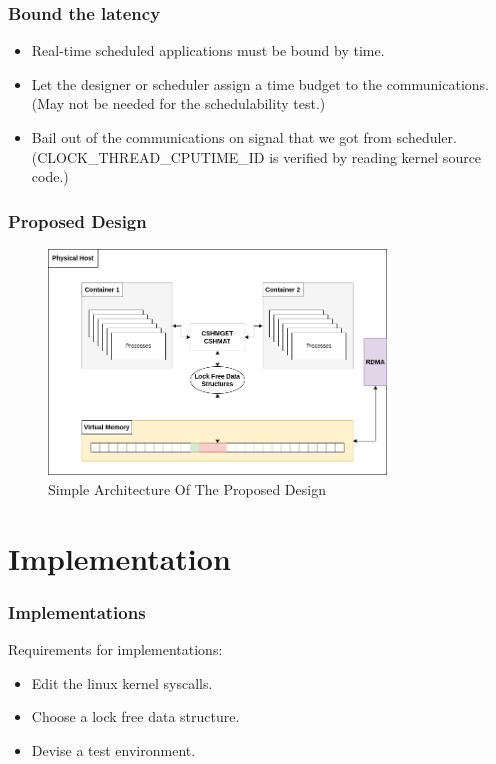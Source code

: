 \documentclass{beamer}
\begin{document}
\begin{frame}
    \frametitle{Bound the latency}
    \begin{itemize}
        \item Real-time scheduled applications must be bound by time.
        \item Let the designer or scheduler assign a time budget to the
            communications. (May not be needed for the schedulability test.)
        \item Bail out of the communications on signal that we got from
            scheduler. (CLOCK\_THREAD\_CPUTIME\_ID is verified by reading
            kernel source code.)
    \end{itemize}
\end{frame}

\begin{frame}
    \frametitle{Proposed Design}
    \begin{figure}
        \centering
        \includegraphics[width=0.8\textwidth]{dist.png}
        \caption{Simple Architecture Of The Proposed Design}
        \label{fig:desg}
    \end{figure}
\end{frame}

\section{Implementation}
\begin{frame}
    \frametitle{Implementations}
    Requirements for implementations:
    \begin{itemize}
        \item Edit the linux kernel syscalls.
        \item Choose a lock free data structure.
        \item Devise a test environment.
    \end{itemize}
\end{frame}
\end{document}
